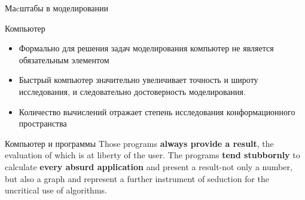 \begin{frame}{Маcштабы в моделировании}
    \centering
\end{frame}

\begin{frame}{Компьютер}
    \begin{itemize}
     \item Формально для решения задач моделирования компьютер не является обязательным элементом
    \vspace{0.2cm}
     \item Быстрый компьютер значительно увеличивает точность и широту исследования, и следовательно достоверность моделирования.
    \vspace{0.2cm}
     \item Количество вычислений отражает степень исследования конформационного
         пространства
    \end{itemize}
\end{frame}

\begin{frame}{Компьютер и программы}
    Those programs \textbf{always provide a result}, the evaluation of which is at liberty of the user. The programs 
    \textbf{tend stubbornly} to calculate \textbf{every absurd application} and present a result-not only a number, but also a graph and
    represent a further instrument of seduction for the uncritical use of algorithms. 
\end{frame}





	


